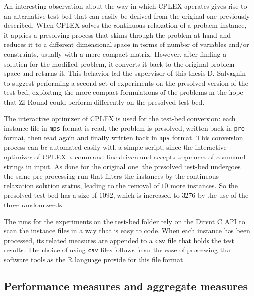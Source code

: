 \documentclass[a4paper,12pt]{book}
\begin{document}
An interesting observation about the way in which CPLEX operates gives rise to an alternative test-bed that can easily be derived from the original one previously described.
When CPLEX solves the continuous relaxation of a problem instance, it applies a presolving process that skims through the problem at hand and reduces it to a different dimensional space in terms of number of variables and/or constraints, usually with a more compact matrix. However, after finding a solution for the modified problem, it converts it back to the original problem space and returns it. This behavior led the supervisor of this thesis D. Salvagnin to suggest performing a second set of experiments on the presolved version of the test-bed, exploiting the more compact formulations of the problems in the hope that ZI-Round could perform differently on the presolved test-bed. \par 

The interactive optimizer of CPLEX is used for the test-bed conversion: each instance file in \texttt{mps} format is read, the problem is presolved, written back in \texttt{pre} format, then read again and finally written back in \texttt{mps} format. This conversion process can be automated easily with a simple script, since the interactive optimizer of CPLEX is command line driven and accepts sequences of command strings in input. As done for the original one, the presolved test-bed undergoes the same pre-processing run that filters the instances by the continuous relaxation solution status, leading to the removal of $10$ more instances. So the presolved test-bed has a size of $1092$, which is increased to $3276$ by the use of the three random seeds. \par

The runs for the experiments on the test-bed folder rely on the Dirent C API to scan the instance files in a way that is easy to code. When each instance has been processed, its related measures are appended to a \texttt{csv} file that holds the test results. The choice of using \texttt{csv} files follows from the ease of processing that software tools as the R language provide for this file format.

\subsection{Performance measures and aggregate measures}
\end{document}

